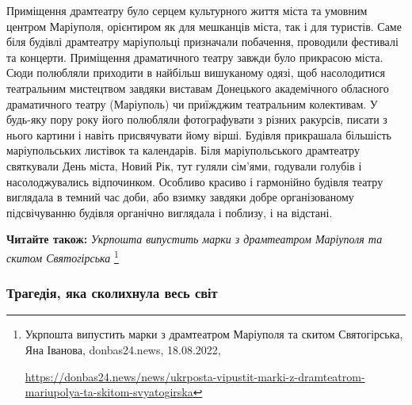Приміщення драмтеатру було серцем культурного життя міста та умовним центром
Маріуполя, орієнтиром як для мешканців міста, так і для туристів. Саме біля
будівлі драмтеатру маріупольці призначали побачення, проводили фестивалі та
концерти. Приміщення драматичного театру завжди було прикрасою міста. Сюди
полюбляли приходити в найбільш вишуканому одязі, щоб насолодитися театральним
мистецтвом завдяки виставам Донецького академічного обласного драматичного
театру (Маріуполь) чи приїжджим театральним колективам. У будь-яку пору року
його полюбляли фотографувати з різних ракурсів, писати з нього картини і навіть
присвячувати йому вірші. Будівля прикрашала більшість маріупольських листівок
та календарів. Біля маріупольського драмтеатру святкували День міста, Новий
Рік, тут гуляли сім'ями, годували голубів і насолоджувались відпочинком.
Особливо красиво і гармонійно будівля театру виглядала в темний час доби, або
взимку завдяки добре організованому підсвічуванню будівля органічно виглядала і
поблизу, і на відстані.

\textbf{Читайте також:} \emph{Укрпошта випустить марки з драмтеатром Маріуполя та скитом Святогірська}%
\footnote{Укрпошта випустить марки з драмтеатром Маріуполя та скитом Святогірська, Яна Іванова, donbas24.news, 18.08.2022, \par%
\url{https://donbas24.news/news/ukrposta-vipustit-marki-z-dramteatrom-mariupolya-ta-skitom-svyatogirska}}


\subsubsection{Трагедія, яка сколихнула весь світ}

